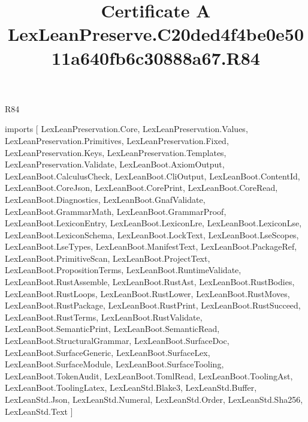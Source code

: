 \begin{lexlean}{R84}
\title{Certificate A LexLeanPreserve.C20ded4f4be0e5011a640fb6c30888a67.R84}
\begin{coremodule}
imports [
  LexLeanPreservation.Core,
  LexLeanPreservation.Values,
  LexLeanPreservation.Primitives,
  LexLeanPreservation.Fixed,
  LexLeanPreservation.Keys,
  LexLeanPreservation.Templates,
  LexLeanPreservation.Validate,
  LexLeanBoot.AxiomOutput,
  LexLeanBoot.CalculusCheck,
  LexLeanBoot.CliOutput,
  LexLeanBoot.ContentId,
  LexLeanBoot.CoreJson,
  LexLeanBoot.CorePrint,
  LexLeanBoot.CoreRead,
  LexLeanBoot.Diagnostics,
  LexLeanBoot.GnafValidate,
  LexLeanBoot.GrammarMath,
  LexLeanBoot.GrammarProof,
  LexLeanBoot.LexiconEntry,
  LexLeanBoot.LexiconLre,
  LexLeanBoot.LexiconLse,
  LexLeanBoot.LexiconSchema,
  LexLeanBoot.LockText,
  LexLeanBoot.LseScopes,
  LexLeanBoot.LseTypes,
  LexLeanBoot.ManifestText,
  LexLeanBoot.PackageRef,
  LexLeanBoot.PrimitiveScan,
  LexLeanBoot.ProjectText,
  LexLeanBoot.PropositionTerms,
  LexLeanBoot.RuntimeValidate,
  LexLeanBoot.RustAssemble,
  LexLeanBoot.RustAst,
  LexLeanBoot.RustBodies,
  LexLeanBoot.RustLoops,
  LexLeanBoot.RustLower,
  LexLeanBoot.RustMoves,
  LexLeanBoot.RustPackage,
  LexLeanBoot.RustPrint,
  LexLeanBoot.RustSucceed,
  LexLeanBoot.RustTerms,
  LexLeanBoot.RustValidate,
  LexLeanBoot.SemanticPrint,
  LexLeanBoot.SemanticRead,
  LexLeanBoot.StructuralGrammar,
  LexLeanBoot.SurfaceDoc,
  LexLeanBoot.SurfaceGeneric,
  LexLeanBoot.SurfaceLex,
  LexLeanBoot.SurfaceModule,
  LexLeanBoot.SurfaceTooling,
  LexLeanBoot.TokenAudit,
  LexLeanBoot.TomlRead,
  LexLeanBoot.ToolingAst,
  LexLeanBoot.ToolingLatex,
  LexLeanStd.Blake3,
  LexLeanStd.Buffer,
  LexLeanStd.Json,
  LexLeanStd.Numeral,
  LexLeanStd.Order,
  LexLeanStd.Sha256,
  LexLeanStd.Text
]


\end{coremodule}
\end{lexlean}
